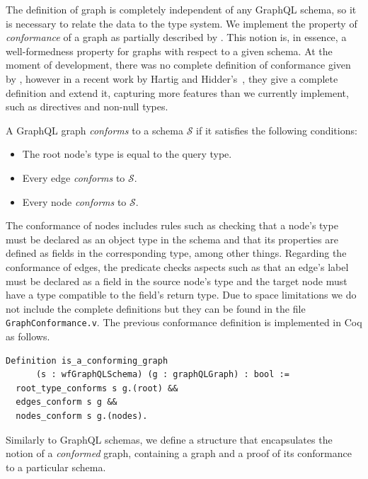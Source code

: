 The definition of graph is completely independent of any GraphQL schema, so it is necessary to relate the data to the type system. We implement the property of \textit{conformance}  of a graph as partially described by \HP{}. This notion is, in essence, a well-formedness property for graphs with respect to a given schema. At the moment of development, there was no complete definition of conformance given by \HP{}, however in a recent work by Hartig and Hidder's~\cite{olafschema}, they give a complete definition and extend it, capturing more features than we currently implement, such as directives and non-null types. 

\begin{definition}
A GraphQL graph \textit{conforms} to a schema $\mathcal{S}$ if it satisfies the following conditions:
\begin{itemize}
    \item The root node's type is equal to the query type.
    \item Every edge \textit{conforms} to $\mathcal{S}$.
    \item Every node \textit{conforms} to $\mathcal{S}$.
\end{itemize}
\end{definition}

The conformance of nodes includes rules such as checking that a node's type must be declared as an object type in the schema and that its properties are defined as fields in the corresponding type, among other things. 
Regarding the conformance of edges, the predicate checks aspects such as that an edge's label must be declared as a field in the source node's type and the target node must have a type compatible to the field's return type.
Due to space limitations we do not include the complete definitions but they can be found in the file \texttt{GraphConformance.v}. The previous conformance definition is implemented in Coq as follows.

\begin{verbatim}
Definition is_a_conforming_graph 
      (s : wfGraphQLSchema) (g : graphQLGraph) : bool :=
  root_type_conforms s g.(root) &&
  edges_conform s g &&
  nodes_conform s g.(nodes).
\end{verbatim}

Similarly to GraphQL schemas, we define a structure that encapsulates the notion of a \textit{conformed} graph, containing a graph and a proof of its conformance to a particular schema.

